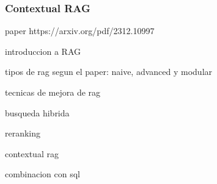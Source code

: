 \subsubsection{Contextual RAG}




paper https://arxiv.org/pdf/2312.10997


introduccion a RAG 

tipos de rag segun el paper: naive, advanced y modular

tecnicas de mejora de rag

busqueda hibrida

reranking

contextual rag

combinacion con sql







